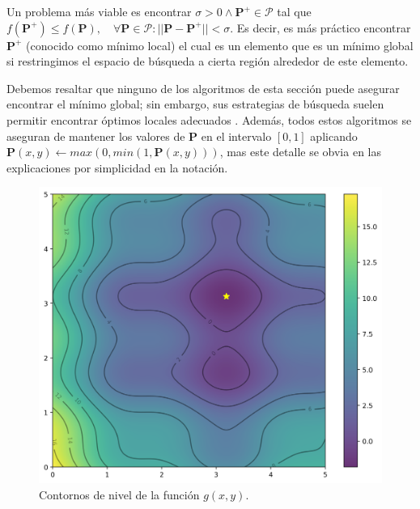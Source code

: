 Un problema más viable es encontrar $\sigma > 0 \land \boldsymbol{P^{+}} \in \pmb{\mathscr{P}}$ 
tal que 
$f(\boldsymbol{P^{+}}) \leq f(\boldsymbol{P}), \quad \forall \boldsymbol{P} \in \pmb{\mathscr{P}}:
|| \boldsymbol{P} - \boldsymbol{P^{+}}|| < \sigma$.
Es decir, es más práctico encontrar $\boldsymbol{P^{+}}$ (conocido como mínimo local)
el cual es un elemento que es un mínimo global si restringimos el espacio de búsqueda a cierta región
alrededor de este elemento.

Debemos resaltar que ninguno de los algoritmos de esta sección puede asegurar encontrar el mínimo global;
sin embargo, sus estrategias de búsqueda suelen permitir encontrar 
óptimos locales adecuados \citep{Angeris2021, Schneider2019}.
Además, todos estos algoritmos se aseguran de mantener los valores de $\boldsymbol{P}$ en el
intervalo $[0, 1]$ aplicando $\boldsymbol{P}(x, y) \gets max(0, min(1, \boldsymbol{P}(x, y)))$, mas
este detalle se obvia en las explicaciones por simplicidad en la notación.



\begin{figure}[ht]
  \centering
  \includegraphics[scale=0.5]{image/theory/countour.png}
   \caption{Contornos de nivel de la función $g(x, y)$.}
  \label{fig:gxy}
\end{figure}


